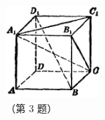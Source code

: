 \begin{lianxi}


\xiaoti{}%
\begin{xiaoxiaotis}%


\end{xiaoxiaotis}

\begin{minipage}{7cm}
    \jiange
    \begin{xiaoxiaotis}







    \end{xiaoxiaotis}
\end{minipage}
\quad
\begin{minipage}{4cm}
    \centering
    \includegraphics[width=3.5cm]{../pic/ltjh-ch1-subsec4-lx-03.png}\\
    （第 3 题）
\end{minipage}

\end{lianxi}

